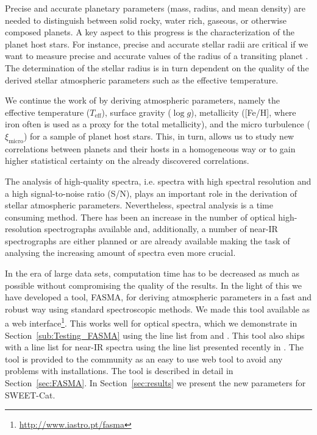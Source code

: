 \documentclass{aa}
\begin{document}
Precise and accurate planetary parameters (mass, radius, and mean density) are
needed to distinguish between solid rocky, water rich, gaseous, or otherwise
composed planets. A key aspect to this progress is the characterization of the
planet host stars. For instance, precise and accurate stellar radii are critical
if we want to measure precise and accurate values of the radius of a transiting
planet \citep[see e.g.][]{Torres2012,Mortier2013}. The determination of the
stellar radius is in turn dependent on the quality of the derived stellar
atmospheric parameters such as the effective temperature.

We continue the work of \citet{Santos13} by deriving atmospheric parameters,
namely the effective temperature ($T_\mathrm{eff}$), surface gravity ($\log g$),
metallicity ([Fe/H], where iron often is used as a proxy for the total
metallicity), and the micro turbulence ($\xi_\mathrm{micro}$) for a sample of
planet host stars. This, in turn, allows us to study new correlations between
planets and their hosts in a homogeneous way or to gain higher statistical
certainty on the already discovered correlations.

The analysis of high-quality spectra, i.e. spectra with high spectral resolution
and a high signal-to-noise ratio (S/N), plays an important role in the
derivation of stellar atmospheric parameters. Nevertheless, spectral analysis is
a time consuming method. There has been an increase in the number of optical
high-resolution spectrographs available and, additionally, a number of near-IR
spectrographs are either planned or are already available making the task of
analysing the increasing amount of spectra even more crucial.

In the era of large data sets, computation time has to be decreased as much as
possible without compromising the quality of the results. In the light of this
we have developed a tool, FASMA, for deriving atmospheric parameters in a fast
and robust way using standard spectroscopic methods. We made this tool available
as a web interface\footnote{\url{http://www.iastro.pt/fasma}}. This works well
for optical spectra, which we demonstrate in Section~\ref{sub:Testing_FASMA}
using the line list from \citet{Sousa2008a} and \citet{Tsantaki2013}. This tool
also ships with a line list for near-IR spectra using the line list presented
recently in \citet{Andreasen2016}. The tool is provided to the community as an
easy to use web tool to avoid any problems with installations. The tool is
described in detail in Section~\ref{sec:FASMA}. In Section~\ref{sec:results} we
present the new parameters for SWEET-Cat.
\end{document}
